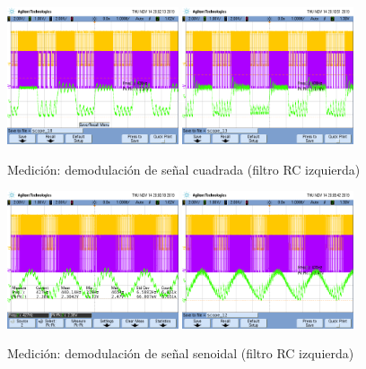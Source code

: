 \begin{figure}[H]
    \centering
    \includegraphics[width=0.45\textwidth]{resources/demodulacionfmcuadradarc.png}
    \includegraphics[width=0.45\textwidth]{resources/demodulacionfmcuadradarrc.png}
    \caption{Medición: demodulación de señal cuadrada (filtro RC izquierda)}
    \label{demodulacionfmcuadrada}
\end{figure}
\begin{figure}[H]
    \centering
    \includegraphics[width=0.45\textwidth]{resources/demodulacionfmsenoidalrc.png}
    \includegraphics[width=0.45\textwidth]{resources/demodulacionfmsenoidalrrc.png}
    \caption{Medición: demodulación de señal senoidal (filtro RC izquierda)}
    \label{demodulacionfmsenoidal}
\end{figure}

